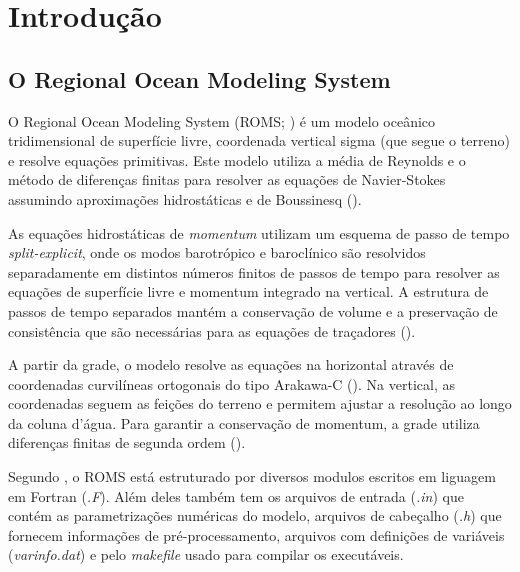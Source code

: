 \chapter{Introdução}

\bigskip


\section{O Regional Ocean Modeling System}
\bigskip
\noindent O Regional Ocean Modeling System (ROMS; \cite{Shchepetkin2005}) é um modelo oceânico tridimensional de superfície livre, coordenada vertical sigma (que segue o terreno) e resolve equações primitivas. Este modelo utiliza a média de Reynolds e o método de diferenças finitas para resolver as equações de Navier-Stokes assumindo aproximações hidrostáticas e de Boussinesq (\cite{Haidvogel2008}).
\bigskip

\noindent As equações hidrostáticas de \textit{momentum} utilizam um esquema de passo de tempo \textit{split-explicit}, onde os modos barotrópico e baroclínico são resolvidos separadamente em distintos números finitos de passos de tempo para resolver as equações de superfície livre e momentum integrado na vertical. A estrutura de passos de tempo separados mantém a conservação de volume e a preservação de consistência que são necessárias para as equações de traçadores (\cite{Shchepetkin2005,Haidvogel2008}).
\bigskip

\noindent A partir da grade, o modelo resolve as equações na horizontal através de coordenadas curvilíneas ortogonais do tipo Arakawa-C (\cite{Arakawa1977}). Na vertical, as coordenadas seguem as feições do terreno e permitem ajustar a resolução ao longo da coluna d'água. Para garantir a conservação de momentum, a grade utiliza diferenças finitas de segunda ordem (\cite{Haidvogel2008}).
\bigskip

\noindent Segundo \textcite{Gouveia2015}, o ROMS está estruturado por diversos modulos escritos em liguagem em Fortran (\textit{.F}). Além deles também tem os arquivos de entrada (\textit{.in}) que contém as parametrizações numéricas do modelo, arquivos de cabeçalho (\textit{.h}) que fornecem informações de pré-processamento, arquivos com definições de variáveis (\textit{varinfo.dat}) e pelo \textit{makefile} usado para compilar os executáveis.
\bigskip

